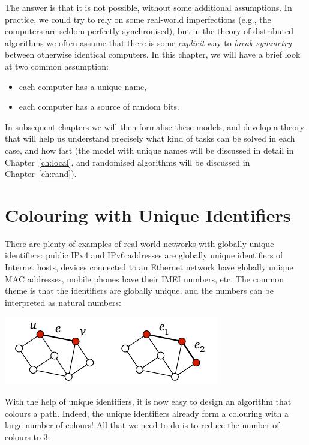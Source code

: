 The answer is that it is not possible, without some additional assumptions. In practice, we could try to rely on some real-world imperfections (e.g., the computers are seldom perfectly synchronised), but in the theory of distributed algorithms we often assume that there is some \emph{explicit} way to \emph{break symmetry} between otherwise identical computers. In this chapter, we will have a brief look at two common assumption:
\begin{itemize}[noitemsep]
    \item each computer has a unique name,
    \item each computer has a source of random bits.
\end{itemize}
In subsequent chapters we will then formalise these models, and develop a theory that will help us understand precisely what kind of tasks can be solved in each case, and how fast (the model with unique names will be discussed in detail in Chapter~\ref{ch:local}, and randomised algorithms will be discussed in Chapter~\ref{ch:rand}).


\section{Colouring with Unique Identifiers}\label{sec:intro-pos-id}

There are plenty of examples of real-world networks with globally unique identifiers: public IPv4 and IPv6 addresses are globally unique identifiers of Internet hosts, devices connected to an Ethernet network have globally unique MAC addresses, mobile phones have their IMEI numbers, etc. The common theme is that the identifiers are globally unique, and the numbers can be interpreted as natural numbers:
\begin{center}
    \includegraphics[page=\PIntroId]{figs.pdf}
\end{center}
With the help of unique identifiers, it is now easy to design an algorithm that colours a path. Indeed, the unique identifiers already form a colouring with a large number of colours! All that we need to do is to reduce the number of colours to $3$.

